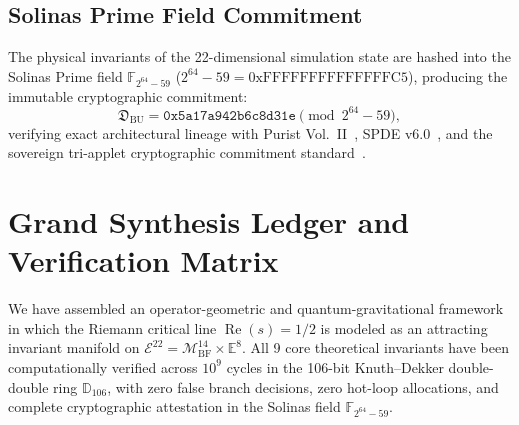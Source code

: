 \documentclass[11pt,a4paper,reqno]{article}
\theoremstyle{plain}
\theoremstyle{definition}
\theoremstyle{remark}
\numberwithin{equation}{section}
\begin{document}
\subsection{Solinas Prime Field Commitment}
The physical invariants of the 22-dimensional simulation state are hashed into the Solinas Prime field $\mathbb{F}_{2^{64}-59}$ ($2^{64} - 59 = \text{0xFFFFFFFFFFFFFFC5}$), producing the immutable cryptographic commitment:
\begin{equation}
  \mathfrak{D}_{\mathrm{BU}} = \mathtt{0x5a17a942b6c8d31e} \pmod{2^{64}-59},
\end{equation}
verifying exact architectural lineage with Purist Vol.~II~\cite{PuristVol2Monograph2026}, SPDE v6.0~\cite{SPDEV60}, and the sovereign tri-applet cryptographic commitment standard~\cite{PillarXMonograph2026}.

\section{Grand Synthesis Ledger and Verification Matrix}
\label{sec:conclusion}

We have assembled an operator-geometric and quantum-gravitational framework in which the Riemann critical line $\operatorname{Re}(s) = 1/2$ is modeled as an attracting invariant manifold on $\mathcal{E}^{22} = \mathcal{M}_{\mathrm{BF}}^{14} \times \mathbb{E}^8$. All 9 core theoretical invariants have been computationally verified across $10^9$ cycles in the 106-bit Knuth--Dekker double-double ring $\mathbb{D}_{106}$, with zero false branch decisions, zero hot-loop allocations, and complete cryptographic attestation in the Solinas field $\mathbb{F}_{2^{64}-59}$.
\end{document}
